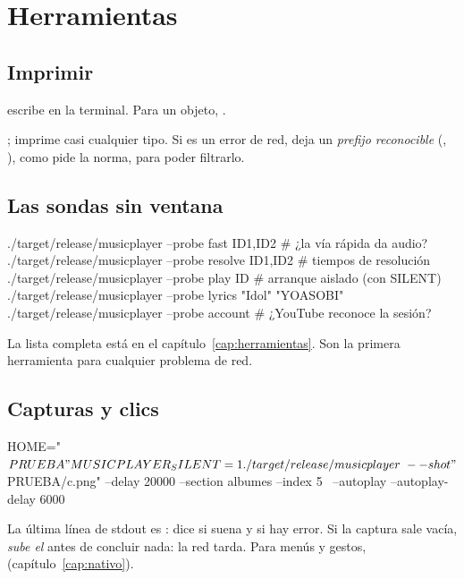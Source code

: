 \section{Herramientas}

\subsection{Imprimir}

\begin{description}[style=nextline, leftmargin=0pt]
  \item[En QML]  escribe en la terminal. Para un objeto,
  .
  \item[En Rust] ;  imprime casi cualquier tipo.
  Si es un error de red, deja un \emph{prefijo reconocible} (, ), como pide la norma, para poder filtrarlo.
\end{description}

\subsection{Las sondas sin ventana}

\begin{terminal}
./target/release/musicplayer --probe fast ID1,ID2     # ¿la vía rápida da audio?
./target/release/musicplayer --probe resolve ID1,ID2  # tiempos de resolución
./target/release/musicplayer --probe play ID          # arranque aislado (con SILENT)
./target/release/musicplayer --probe lyrics "Idol" "YOASOBI"
./target/release/musicplayer --probe account          # ¿YouTube reconoce la sesión?
\end{terminal}

La lista completa está en el capítulo~\ref{cap:herramientas}. Son la primera herramienta
para cualquier problema de red.

\subsection{Capturas y clics}

\begin{terminal}
HOME="$PRUEBA" MUSICPLAYER_SILENT=1 ./target/release/musicplayer \
  --shot "$PRUEBA/c.png" --delay 20000 --section albumes --index 5 \
  --autoplay --autoplay-delay 6000
\end{terminal}

La última línea de stdout es : dice si suena y si hay error. Si la captura
sale vacía, \emph{sube el } antes de concluir nada: la red tarda. Para menús y
gestos, \cod{MUSICPLAYER_DEBUG_CLICK} (capítulo~\ref{cap:nativo}).

